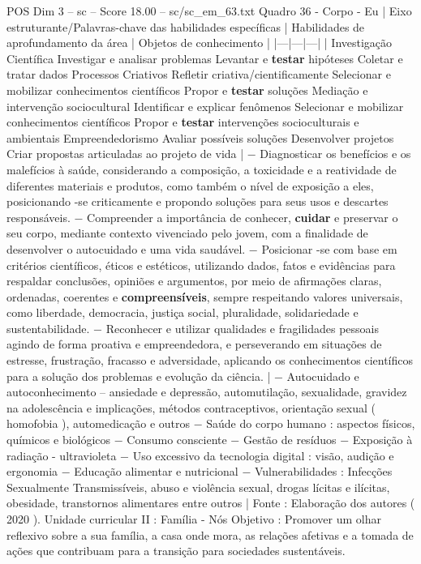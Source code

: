 \begin{textsample}{POS Dim 3 – sc – Score 18.00 – sc/sc\_em\_63.txt}
Quadro 36 - Corpo - Eu | Eixo estruturante/Palavras-chave das habilidades específicas | Habilidades de aprofundamento da área | Objetos de conhecimento | |---|---|---| | Investigação Científica Investigar e analisar problemas Levantar e \textbf{testar} hipóteses Coletar e tratar dados Processos Criativos Refletir criativa/cientificamente Selecionar e mobilizar conhecimentos científicos Propor e \textbf{testar} soluções Mediação e intervenção sociocultural Identificar e explicar fenômenos Selecionar e mobilizar conhecimentos científicos Propor e \textbf{testar} intervenções socioculturais e ambientais Empreendedorismo Avaliar possíveis soluções Desenvolver projetos Criar propostas articuladas ao projeto de vida | − Diagnosticar os benefícios e os malefícios à saúde, considerando a composição, a toxicidade e a reatividade de diferentes materiais e produtos, como também o nível de exposição a eles, posicionando -se criticamente e propondo soluções para seus usos e descartes responsáveis. − Compreender a importância de conhecer, \textbf{cuidar} e preservar o seu corpo, mediante contexto vivenciado pelo jovem, com a finalidade de desenvolver o autocuidado e uma vida saudável. − Posicionar -se com base em critérios científicos, éticos e estéticos, utilizando dados, fatos e evidências para respaldar conclusões, opiniões e argumentos, por meio de afirmações claras, ordenadas, coerentes e \textbf{compreensíveis}, sempre respeitando valores universais, como liberdade, democracia, justiça social, pluralidade, solidariedade e sustentabilidade. − Reconhecer e utilizar qualidades e fragilidades pessoais agindo de forma proativa e empreendedora, e perseverando em situações de estresse, frustração, fracasso e adversidade, aplicando os conhecimentos científicos para a solução dos problemas e evolução da ciência. | − Autocuidado e autoconhecimento – ansiedade e depressão, automutilação, sexualidade, gravidez na adolescência e implicações, métodos contraceptivos, orientação sexual ( homofobia ), automedicação e outros − Saúde do corpo humano : aspectos físicos, químicos e biológicos − Consumo consciente − Gestão de resíduos − Exposição à radiação - ultravioleta − Uso excessivo da tecnologia digital : visão, audição e ergonomia − Educação alimentar e nutricional − Vulnerabilidades : Infecções Sexualmente Transmissíveis, abuso e violência sexual, drogas lícitas e ilícitas, obesidade, transtornos alimentares entre outros | Fonte : Elaboração dos autores ( 2020 ).
Unidade curricular II : Família - Nós Objetivo : Promover um olhar reflexivo sobre a sua família, a casa onde mora, as relações afetivas e a tomada de ações que contribuam para a transição para sociedades sustentáveis.

\end{textsample}
